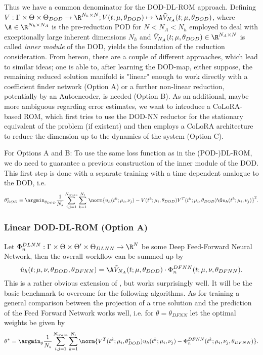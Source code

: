 Thus we have a common denominator for the DOD-DL-ROM approach. Defining $V: \Gamma \times \Theta \times \Theta_{DOD} \to \R^{N_h \times N}; V(t; \mu, \theta_{DOD}) \mapsto \A \Tilde{V}_{N_A}(t; \mu, \theta_{DOD})$, where $\A \in \R^{N_h \times N_A}$ is the pre-reduction POD for $N < N_A < N_h$ employed to deal with exceptionally large inherent dimensions $N_h$ and $\Tilde{V}_{N_A}(t; \mu, \theta_{DOD}) \in \R^{N_A \times N}$ is called \emph{inner module} of the DOD, yields the foundation of the reduction consideration. From hereon, there are a couple of different approaches, which lead to similar ideas; one is able to, after learning the DOD-map, either suppose, the remaining reduced solution manifold is "linear" enough to work directly with a coefficient finder network (Option A) or a further non-linear reduction, potentially by an Autoencoder, is needed (Option B). As an additional, maybe more ambiguous regarding error estimates, we want to introduce a CoLoRA-based ROM, which first tries to use the DOD-NN reductor for the stationary equivalent of the problem (if existent) and then employs a CoLoRA architecture to reduce the dimension up to the dynamics of the system (Option C). 

For Options A and B: To use the same loss function as in the (POD-)DL-ROM, we do need to guarantee a previous construction of the inner module of the DOD. This first step is done with a separate training with a time dependent analogue to the DOD, i.e.
\begin{equation}
    \theta_{DOD}^* = \argmin_{\theta_{DOD}} \frac{1}{N_s} \sum_{i,j = 1}^{N_{train}} \sum_{k = 1}^{N_t} \, \norm{u_h(t^k; \mu_i, \nu_j) - V(t^k; \mu_i, \theta_{DOD}) V^T(t^k; \mu_i, \theta_{DOD}) \G u_h(t^k; \mu_i, \nu_j)}^2.
\end{equation}

\subsubsection{Linear DOD-DL-ROM (Option A)}

Let $\Phi_n^{DLNN}: \Gamma \times \Theta \times \Theta' \times \Theta_{DLNN} \to \R^{N}$ be some Deep Feed-Forward Neural Network, then the overall workflow can be summed up by
\begin{equation}
    \hat{u}_h(t; \mu, \nu, \theta_{DOD}, \theta_{DFNN}) = \A \Tilde{V}_{N_A}(t; \mu, \theta_{DOD}) \cdot \Phi_n^{DFNN}(t; \mu, \nu, \theta_{DFNN}).
\end{equation}
This is a rather obvious extension of \cite{DOD}, but works surprisingly well. It will be the basic benchmark to overcome for the following algorithms. As for training a general comparison between the projection of a true solution and the prediction of the Feed Forward Network works well, i.e. for $\theta = \theta_{DFNN}$ let the optimal weights be given by
\begin{equation}
    \theta^* = \argmin_\theta \frac{1}{N_s} \sum_{i, j = 1}^{N_{train}} \sum_{k = 1}^{N_t} \norm{V^T(t^k; \mu_i, \theta^*_{DOD}) u_h(t^k; \mu_i, \nu_j) - \Phi_n^{DFNN}(t^k; \mu_i, \nu_j, \theta_{DFNN})}.
\end{equation}


